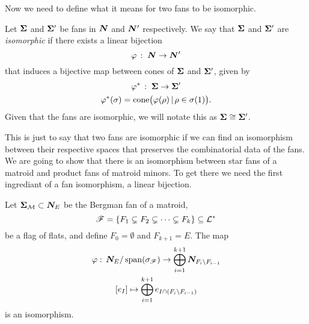 \documentclass[12pt,oneside]{../../sfsuthesis}
\begin{document}
Now we need to define what it means for two fans to be isomorphic.
\begin{definition}\th\label{def:fanIsomorphism}
    Let \( \bm{\Sigma} \) and \( \bm{\Sigma}' \) be fans in \( \bm{N} \) and \( \bm{N}' \) respectively.
    We say that \( \bm{\Sigma} \) and \( \bm{\Sigma}' \) are \emph{isomorphic} if there exists a linear bijection
    \[
        \varphi\,:\; \bm{N} \to \bm{N}'
    \]
    that induces a bijective map between cones of \( \bm{\Sigma} \) and \( \bm{\Sigma}' \), given by
    \begin{gather*}
        \varphi^\ast \,:\; \bm{\Sigma} \to \bm{\Sigma}' \\
        \varphi^\ast(\sigma) = \mathrm{cone}\big(\varphi(\rho) \,|\, \rho \in \sigma(1)\big).
    \end{gather*}
    Given that the fans are isomorphic, we will notate this as \( \bm{\Sigma} \cong \bm{\Sigma}' \).
\end{definition}
This is just to say that two fans are isomorphic if we can find an isomorphism between their respective spaces that preserves the combinatorial data of the fans.
We are going to show that there is an isomorphism between star fans of a matroid and product fans of matroid minors.
To get there we need the first ingrediant of a fan isomorphism, a linear bijection.
\begin{proposition}\th\label{thm:quotientBijection}
    Let \( \bm{\Sigma}_{\mathcal{M}} \subset \bm{N}_E \) be the Bergman fan of a matroid,
    \[
        \mathscr{F} = \{ F_1 \subsetneq F_2 \subsetneq \cdots \subsetneq F_k \} \subseteq \mathcal{L}^\ast
    \]
    be a flag of flats, and define \( F_0 = \emptyset \) and \( F_{k+1} = E \).
    The map
    \begin{gather*}
        \varphi:\, \bm{N}_E / \operatorname{span}(\sigma_{\mathscr{F}}) \to \bigoplus_{i=1}^{k+1} \bm{N}_{F_i \setminus F_{i-1}} \\
        [e_I] \mapsto \bigoplus_{i=1}^{k+1} e_{I \cap (F_i \setminus F_{i-1})}
    \end{gather*}
    is an isomorphism.
\end{proposition}
\end{document}
